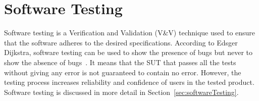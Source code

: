 

\section{Software Testing} 
Software testing is a Verification and Validation (V\&V) technique used to ensure that the software adheres to the desired specifications. According to Edsger Dijkstra, software testing can be used to show the presence of bugs but never to show the absence of bugs~\cite{dahl1972structured}. It means that the SUT that passes all the tests without giving any error is not guaranteed to contain no error. However, the testing process increases reliability and confidence of users in the tested product. Software testing is discussed in more detail in Section~\ref{sec:softwareTesting}.

